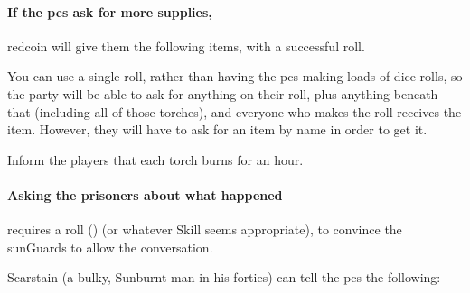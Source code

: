 \begin{multicols}{2}

\paragraph{If the \glspl{pc} ask for more supplies,}
\gls{redcoin} will give them the following items, with a successful  roll.

You can use a single roll, rather than having the \glspl{pc} making loads of dice-rolls, so the party will be able to ask for anything on their roll, plus anything beneath that  (including all of those torches), and everyone who makes the roll receives the item.
However, they will have to ask for an item by name in order to get it.

Inform the players that each torch burns for an hour.

\paragraph{Asking the prisoners about what happened}
requires a  roll (\tn[8]) (or whatever Skill seems appropriate), to convince the \glspl{sunGuard} to allow the conversation.

Scarstain (a bulky, Sunburnt man in his forties) can tell the \glspl{pc} the following:


\end{multicols}
